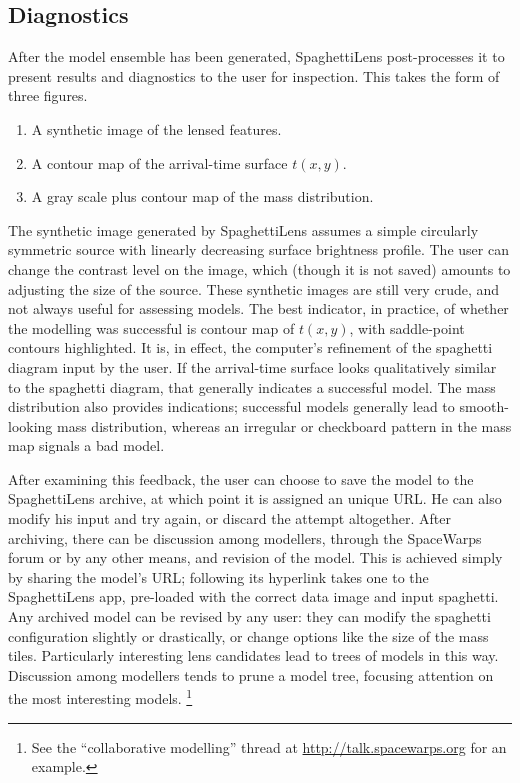 \documentclass[usenatbib]{mn2e}
\newcommand{\spl}{SpaghettiLens\xspace}
\newcommand{\sw}{SpaceWarps\xspace}
\begin{document}

\subsection{Diagnostics}
\label{sec:diag}

After the model ensemble has been generated, \spl post-processes it to
present results and diagnostics to the user for inspection. This takes
the form of three figures.
\begin{enumerate}
\item A synthetic image of the lensed features.
\item A contour map of the arrival-time surface $t(x,y)$.
\item A gray scale plus contour map of the mass distribution.
\end{enumerate}
The synthetic image generated by \spl assumes a simple
circularly symmetric source with linearly decreasing
surface brightness profile.  The user can change the contrast level
on the image, which (though it is not saved) amounts to adjusting the
size of the source. These synthetic images are still very
crude, and not always useful for assessing models.  The best
indicator, in practice, of whether the modelling was successful is
contour map of $t(x,y)$, with saddle-point contours highlighted.  It
is, in effect, the computer's refinement of the spaghetti diagram
input by the user.  If the arrival-time surface looks qualitatively
similar to the spaghetti diagram, that generally indicates a
successful model.  The mass distribution also provides indications;
successful models generally lead to smooth-looking mass distribution,
whereas an irregular or checkboard pattern in the mass map signals a
bad model.

After examining this feedback, the user can choose to save the
model to the \spl archive, at which point it is assigned an unique
URL.  He can also modify his input and try again, or discard the
attempt altogether.  After archiving, there can be discussion among
modellers, through the \sw forum or by any other means, and revision
of the model.  This is achieved simply by sharing the model's
URL; following its hyperlink takes one to the \spl app, pre-loaded
with the correct data image and input spaghetti. Any archived model
can be revised by any user: they can modify the spaghetti
configuration slightly or drastically, or change options like the size
of the mass tiles. Particularly interesting lens candidates lead to
trees of models in this way.  Discussion among modellers tends to
prune a model tree, focusing attention on the most interesting
models.
\footnote{See the ``collaborative modelling'' thread at
\url{ http://talk.spacewarps.org} for an example.}
\end{document}
